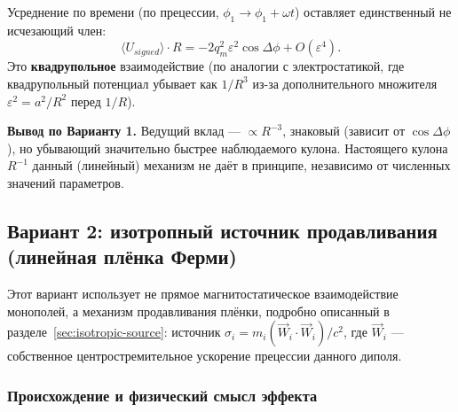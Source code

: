 \documentclass[12pt,a4paper]{article}
\begin{document}
Усреднение по времени (по прецессии, $\phi_1\to\phi_1+\omega t$)
оставляет единственный не исчезающий член:
\begin{equation}
\langle U_{signed}\rangle \cdot R = -2q_m^2\varepsilon^2\cos\Delta\phi
+ O(\varepsilon^4).
\end{equation}
Это \textbf{квадрупольное} взаимодействие (по аналогии с
электростатикой, где квадрупольный потенциал убывает как $1/R^3$
из-за дополнительного множителя $\varepsilon^2=a^2/R^2$ перед $1/R$).

\textbf{Вывод по Варианту 1.} Ведущий вклад --- $\propto R^{-3}$,
знаковый (зависит от $\cos\Delta\phi$), но убывающий значительно
быстрее наблюдаемого кулона. Настоящего кулона $R^{-1}$ данный
(линейный) механизм не даёт в принципе, независимо от численных
значений параметров.

\subsection{Вариант 2: изотропный источник продавливания (линейная плёнка Ферми)}
\label{sec:variant2}

Этот вариант использует не прямое магнитостатическое взаимодействие
монополей, а механизм продавливания плёнки, подробно описанный в
разделе~\ref{sec:isotropic-source}: источник $\sigma_i=m_i(\vec
W_i\cdot\vec W_i)/c^2$, где $\vec W_i$ --- собственное центростремительное
ускорение прецессии данного диполя.

\subsubsection{Происхождение и физический смысл эффекта}
\end{document}
